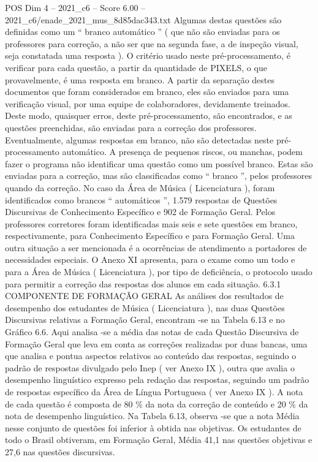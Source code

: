 \begin{textsample}{POS Dim 4 – 2021\_c6 – Score 6.00 – 2021\_c6/enade\_2021\_mus\_8d85dac343.txt}
Algumas destas questões são definidas como um “ branco automático ” ( que não são enviadas para os professores para correção, a não ser que na segunda fase, a de inspeção visual, seja constatada uma resposta ).
O critério usado neste pré-processamento, é verificar para cada questão, a partir da quantidade de PIXELS, o que provavelmente, é uma resposta em branco.
A partir da separação destes documentos que foram considerados em branco, eles são enviados para uma verificação visual, por uma equipe de colaboradores, devidamente treinados.
Deste modo, quaisquer erros, deste pré-processamento, são encontrados, e as questões preenchidas, são enviadas para a correção dos professores.
Eventualmente, algumas respostas em branco, não são detectadas neste pré-processamento automático.
A presença de pequenos riscos, ou manchas, podem fazer o programa não identificar uma questão como um possível branco.
Estas são enviadas para a correção, mas são classificadas como “ branco ”, pelos professores quando da correção.
No caso da Área de Música ( Licenciatura ), foram identificados como brancos “ automáticos ”, 1.579 respostas de Questões Discursivas de Conhecimento Específico e 902 de Formação Geral.
Pelos professores corretores foram identificadas mais seis e sete questões em branco, respectivamente, para Conhecimento Específico e para Formação Geral.
Uma outra situação a ser mencionada é a ocorrências de atendimento a portadores de necessidades especiais.
O Anexo XI apresenta, para o exame como um todo e para a Área de Música ( Licenciatura ), por tipo de deficiência, o protocolo usado para permitir a correção das respostas dos alunos em cada situação. 6.3.1 COMPONENTE DE FORMAÇÃO GERAL As análises dos resultados de desempenho dos estudantes de Música ( Licenciatura ), nas duas Questões Discursivas relativas a Formação Geral, encontram -se na Tabela 6.13 e no Gráfico 6.6.
Aqui analisa -se a média das notas de cada Questão Discursiva de Formação Geral que leva em conta as correções realizadas por duas bancas, uma que analisa e pontua aspectos relativos ao conteúdo das respostas, seguindo o padrão de respostas divulgado pelo Inep ( ver Anexo IX ), outra que avalia o desempenho linguístico expresso pela redação das respostas, seguindo um padrão de respostas específico da Área de Língua Portuguesa ( ver Anexo IX ).
A nota de cada questão é composta de 80 \% da nota da correção de conteúdo e 20 \% da nota de desempenho linguístico.
Na Tabela 6.13, observa -se que a nota Média nesse conjunto de questões foi inferior à obtida nas objetivas.
Os estudantes de todo o Brasil obtiveram, em Formação Geral, Média 41,1 nas questões objetivas e 27,6 nas questões discursivas.

\end{textsample}
